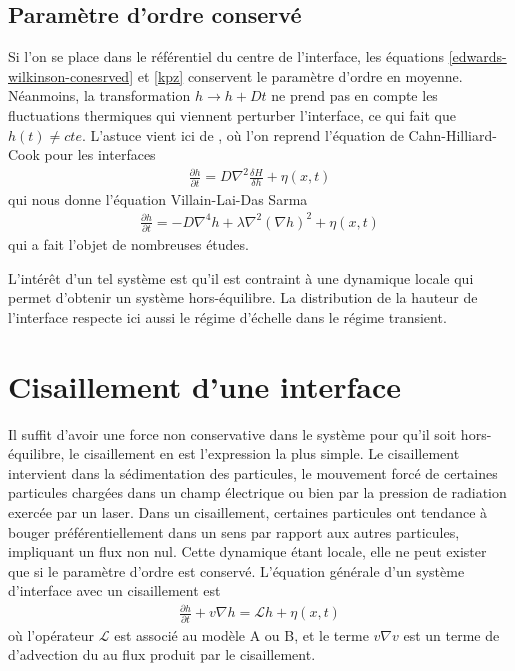     \subsection{Paramètre d'ordre conservé}

Si l'on se place dans le référentiel du centre de l'interface, les équations \ref{edwards-wilkinson-conesrved} et \ref{kpz} conservent le paramètre d'ordre en moyenne. Néanmoins, la transformation $h \rightarrow h + Dt$ ne prend pas en compte les fluctuations thermiques qui viennent perturber l'interface, ce qui fait que $h(t) \neq cte$. L'astuce vient ici de \cite{kawasaki_diffusion_1966,kawasaki_correlation-function_1966}, où l'on reprend l'équation de Cahn-Hilliard-Cook pour les interfaces
\begin{align}
    \frac{\partial h}{\partial t} = D \nabla^2 \frac{\delta H}{\delta h} +  \eta(x,t)
\end{align}
qui nous donne l'équation Villain-Lai-Das Sarma\cite{villain_continuum_1991,lai_kinetic_1991}
\begin{align}
    \frac{\partial h}{\partial t} = - D \nabla^4 h + \lambda \nabla^2 (\nabla h) ^2 +  \eta(x,t)
\end{align}
qui a fait l'objet de nombreuses études\cite{kim_conserved_1994,assis_dynamic_2015}.

L'intérêt d'un tel système est qu'il est contraint à une dynamique locale qui permet d'obtenir un système hors-équilibre. La distribution de la hauteur de l'interface respecte ici aussi le régime d'échelle  \cite{oliveira_maximal-_2008,singha_renormalization_2016} dans le régime transient. 

    \section{Cisaillement d'une interface}

Il suffit d'avoir une force non conservative dans le système pour qu'il soit hors-équilibre, le cisaillement en est l'expression la plus simple. Le cisaillement intervient dans la sédimentation des particules, le mouvement forcé de certaines particules chargées dans un champ électrique ou bien par la pression de radiation exercée par un laser. 
Dans un cisaillement, certaines particules ont tendance à bouger préférentiellement dans un sens par rapport aux autres particules, impliquant un flux non nul. Cette dynamique étant locale, elle ne peut exister que si le paramètre d'ordre est conservé. L'équation générale d'un système d'interface avec un cisaillement est\cite{bray_interface_2001-1,bray_interface_2001}
\begin{align}
     \frac{\partial h}{\partial t} + v \nabla h =  \mathcal{L} h +  \eta(x,t)
     \label{eq-cisaillement}
\end{align}
où l'opérateur $\mathcal{L}$ est associé au modèle A ou B, et le terme $v \nabla v$ est un terme de d'advection du au flux produit par le cisaillement. 


